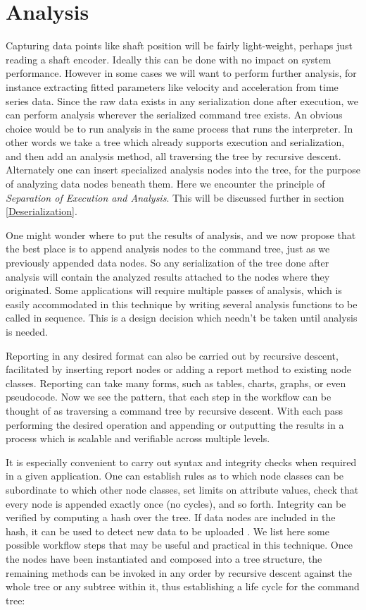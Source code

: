 \documentclass[a4paper,10pt]{article}
\begin{document}
\section{Analysis}

Capturing data points like shaft position will be fairly light-weight, perhaps just reading a shaft encoder. Ideally this can be done with no impact on system performance. However in some cases we will want to perform further analysis, for instance extracting fitted parameters like velocity and acceleration from time series data. Since the raw data exists in any serialization done after execution, we can perform analysis wherever the serialized command tree exists. An obvious choice would be to run analysis in the same process that runs the interpreter. In other words we take a tree which already supports execution and serialization, and then add an analysis method, all traversing the tree by recursive descent. Alternately one can insert specialized analysis nodes into the tree, for the purpose of analyzing data nodes beneath them. Here we encounter the principle of \textit{Separation of Execution and Analysis}. This will be discussed further in section \ref{Deserialization}.

One might wonder where to put the results of analysis, and we now propose that the best place is to append analysis nodes to the command tree, just as we previously appended data nodes. So any serialization of the tree done after analysis will contain the analyzed results attached to the nodes where they originated. Some applications will require multiple passes of analysis, which is easily accommodated in this technique by writing several analysis functions to be called in sequence. This is a design decision which needn't be taken until analysis is needed.

Reporting in any desired format can also be carried out by recursive descent, facilitated by inserting report nodes or adding a report method to existing node classes. Reporting can take many forms, such as tables, charts, graphs, or even pseudocode. Now we see the pattern, that each step in the workflow can be thought of as traversing a command tree by recursive descent. With each pass performing the desired operation and appending or outputting the results in a process which is scalable and verifiable across multiple levels.

It is especially convenient to carry out syntax and integrity checks when required in a given application. One can establish rules as to which node classes can be subordinate to which other node classes, set limits on attribute values, check that every node is appended exactly once (no cycles), and so forth. Integrity can be verified by computing a hash over the tree. If data nodes are included in the hash, it can be used to detect new data to be uploaded \cite{MerkleTree}. We list here some possible workflow steps that may be useful and practical in this technique. Once the nodes have been instantiated and composed into a tree structure, the remaining methods can be invoked in any order by recursive descent against the whole tree or any subtree within it, thus establishing a life cycle for the command tree:
\end{document}

